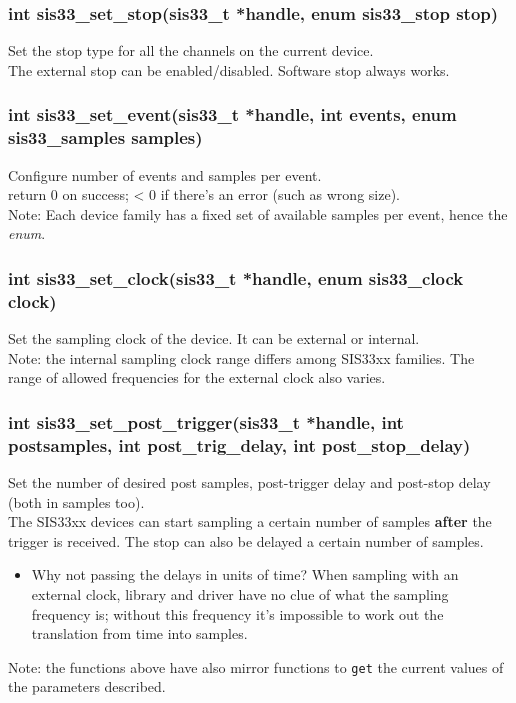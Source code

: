 \documentclass[12pt,a4paper]{article}
\begin{document}
\subsubsection*{int sis33\_set\_stop(sis33\_t *handle, enum sis33\_stop stop)}
\label{sec-2.3.2}

Set the stop type for all the channels on the current device. \\
The external stop can be enabled/disabled. Software stop always
works.

\subsubsection*{int sis33\_set\_event(sis33\_t *handle, int events,
  enum sis33\_samples samples)}
\label{sec-2.3.3}

Configure number of events and samples per event. \\
return 0 on success; < 0 if there's an error (such as wrong size). \\
Note: Each device family has a fixed set of available samples per event,
hence the \emph{enum}.

\subsubsection*{int sis33\_set\_clock(sis33\_t *handle, enum sis33\_clock clock)}
\label{sec-2.3.4}

Set the sampling clock of the device. It can be external or internal. \\
Note: the internal sampling clock range differs among SIS33xx families.
The range of allowed frequencies for the external clock also varies.

\subsubsection*{int sis33\_set\_post\_trigger(sis33\_t *handle, int postsamples,
  int post\_trig\_delay, int post\_stop\_delay)}
\label{sec-2.3.5}

Set the number of desired post samples, post-trigger delay and post-stop
delay (both in samples too). \\
The SIS33xx devices can start sampling a certain number of samples \textbf{after}
the trigger is received. The stop can also be delayed a certain number
of samples. \\
\begin{itemize}
\item Why not passing the delays in units of time? When sampling with an
  external clock, library and driver have no clue of what the sampling
  frequency is; without this frequency it's impossible to work out
  the translation from time into samples.
\end{itemize}
Note: the functions above have also mirror functions to \verb~get~ the current
values of the parameters described.
\end{document}
